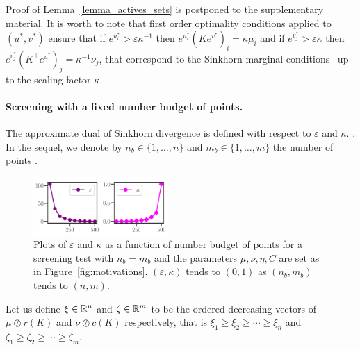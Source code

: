 Proof of Lemma~\ref{lemma_actives_sets} is postponed to the supplementary material. It is worth to note that first order optimality conditions applied to $(u^{*}, v^{*})$ ensure that if $e^{u^{*}_i} > \varepsilon\kappa^{-1}$ then $e^{u^{*}_i} (Ke^{v^{*}})_i =  \kappa\mu_i$ and if $e^{v^{*}_j} > \varepsilon\kappa$ then $e^{v^{*}_j} (K^\top e^{u^{*}})_j =  \kappa^{-1}\nu_j$, that correspond to the Sinkhorn marginal conditions~\citep{peyre2019COTnowpublisher} up to the scaling factor $\kappa$. 

\paragraph{Screening with a fixed number budget of points.}
The approximate dual of Sinkhorn divergence is defined with respect to $\varepsilon$ and $\kappa$. .
In the sequel, we denote by $n_b \in\{1, \ldots, n\}$ and $m_b\in\{1, \ldots, m\}$ the number of points . 
\begin{figure}
\vspace{-12pt}
\centering
\includegraphics[width=0.46\textwidth]{./figs/kappa_epsilon.pdf}
\caption{Plots of $\varepsilon$ and $\kappa$ as a function of number budget of points for a screening test with $n_b=m_b$ and the parameters $\mu, \nu, \eta, C$ are set as in Figure~\eqref{fig:motivations}.  $(\varepsilon, \kappa)$ tends to $(0,1)$ as $(n_b,m_b)$ tends to $(n,m)$.}
\label{fig:kappa_epsilon}
\vspace{-15pt}
\end{figure}
Let us define $\xi \in {\mathbb{R}}^n$ and $\zeta \in {\mathbb{R}}^m$ to be the ordered decreasing vectors of $\mu \oslash r(K)$ and $\nu \oslash c(K)$ respectively, that is $\xi_1 \geq \xi_2 \geq \cdots \geq \xi_n$ and $\zeta_1 \geq \zeta_2 \geq \cdots \geq \zeta_m$.
